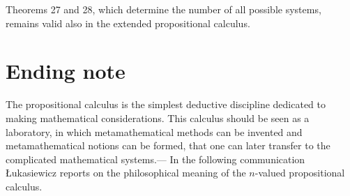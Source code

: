 \documentclass{article}
\theoremstyle{definition}
\begin{document}
Theorems 27 and 28, which determine the number of all possible systems, remains valid also in the extended propositional calculus.

\section{Ending note}
The propositional calculus is the simplest deductive discipline dedicated to making mathematical considerations. This calculus should be seen as a laboratory, in which metamathematical methods can be invented and metamathematical notions can be formed, that one can later transfer to the complicated mathematical systems.--- In the following communication Łukasiewicz reports on the philosophical meaning of the $n$-valued propositional calculus.
\end{document}
